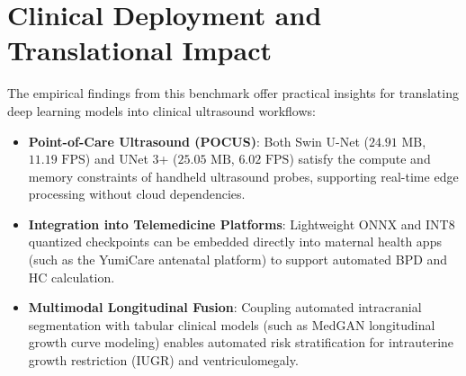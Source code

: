 \documentclass[conference]{IEEEtran}
\begin{document}
\section{Clinical Deployment and Translational Impact}
\label{sec:deployment}

The empirical findings from this benchmark offer practical insights for translating deep learning models into clinical ultrasound workflows:
\begin{itemize}
    \item \textbf{Point-of-Care Ultrasound (POCUS)}: Both Swin U-Net ($24.91\text{ MB}$, $11.19\text{ FPS}$) and UNet 3+ ($25.05\text{ MB}$, $6.02\text{ FPS}$) satisfy the compute and memory constraints of handheld ultrasound probes, supporting real-time edge processing without cloud dependencies.
    \item \textbf{Integration into Telemedicine Platforms}: Lightweight ONNX and INT8 quantized checkpoints can be embedded directly into maternal health apps (such as the YumiCare antenatal platform) to support automated BPD and HC calculation.
    \item \textbf{Multimodal Longitudinal Fusion}: Coupling automated intracranial segmentation with tabular clinical models (such as MedGAN longitudinal growth curve modeling) enables automated risk stratification for intrauterine growth restriction (IUGR) and ventriculomegaly.
\end{itemize}

\end{document}
